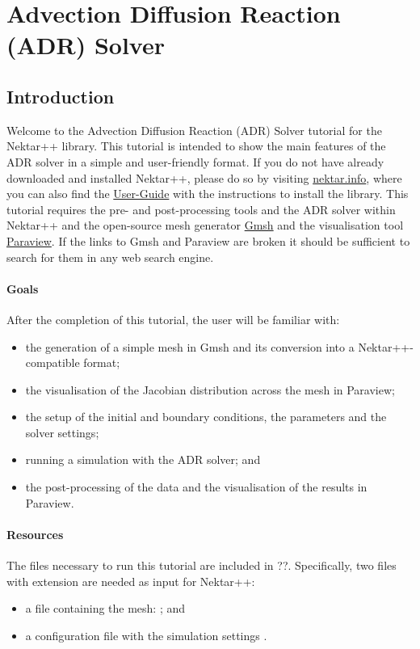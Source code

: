 \chapter{Advection Diffusion Reaction (ADR) Solver}
\label{ADR}

\section*{\Large Introduction}
Welcome to the Advection Diffusion Reaction (ADR) Solver tutorial for the Nektar++ library.
This tutorial is intended to show the main features of the ADR solver in a simple and user-friendly 
format. If you do not have already downloaded and installed Nektar++, please do so by visiting 
\href{http://www.nektar.info}{nektar.info}, where you can also find the 
\href{http://www.nektar.info/downloads/8}{User-Guide} with the instructions 
to install the library. This tutorial requires the pre- and post-processing tools and the ADR 
solver within Nektar++ and the open-source mesh generator \href{http://geuz.org/gmsh/}{Gmsh} 
and the visualisation tool \href{http://www.paraview.org}{Paraview}. If the links to Gmsh and Paraview 
are broken it should be sufficient to search for them in any web search engine.  


\subsubsection*{Goals}
After the completion of this tutorial, the user will be familiar with:
\vspace{-0.5cm}
\begin{itemize}
\item the generation of a simple mesh in Gmsh and its conversion into a Nektar++-compatible format;
\item the visualisation of the Jacobian distribution across the mesh in Paraview;
\item the setup of the initial and boundary conditions, the parameters and the solver settings;
\item running a simulation with the ADR solver; and
\item the post-processing of the data and the visualisation of the results in Paraview.
\end{itemize}

\subsubsection*{Resources}
The files necessary to run this tutorial are included in ??.  
Specifically, two files with extension  are needed as input for Nektar++: 
\vspace{-0.5cm}
\begin{itemize}
\item a file containing the mesh: ; and 
\item a configuration file with the simulation settings .
\end{itemize}

